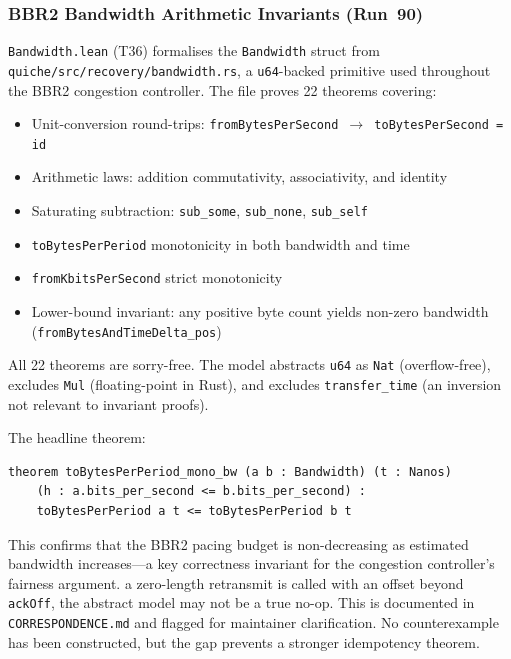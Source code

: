 \documentclass[sigconf,10pt]{acmart}
\begin{document}
\subsubsection{BBR2 Bandwidth Arithmetic Invariants (Run~90)}

\texttt{Bandwidth.lean} (T36) formalises the \texttt{Bandwidth} struct from
\texttt{quiche/src/recovery/bandwidth.rs}, a \texttt{u64}-backed primitive
used throughout the BBR2 congestion controller.
The file proves 22 theorems covering:

\begin{itemize}
  \item Unit-conversion round-trips:
    \texttt{fromBytesPerSecond~$\to$~toBytesPerSecond = id}
  \item Arithmetic laws: addition commutativity, associativity, and
    identity
  \item Saturating subtraction: \texttt{sub\_some}, \texttt{sub\_none},
    \texttt{sub\_self}
  \item \texttt{toBytesPerPeriod} monotonicity in both bandwidth and time
  \item \texttt{fromKbitsPerSecond} strict monotonicity
  \item Lower-bound invariant: any positive byte count yields non-zero
    bandwidth (\texttt{fromBytesAndTimeDelta\_pos})
\end{itemize}

All 22 theorems are sorry-free.
The model abstracts \texttt{u64} as \texttt{Nat} (overflow-free),
excludes \texttt{Mul} (floating-point in Rust), and excludes
\texttt{transfer\_time} (an inversion not relevant to invariant proofs).

The headline theorem:
\begin{lstlisting}[caption={\texttt{toBytesPerPeriod\_mono\_bw}: monotonicity of byte budget.}]
theorem toBytesPerPeriod_mono_bw (a b : Bandwidth) (t : Nanos)
    (h : a.bits_per_second <= b.bits_per_second) :
    toBytesPerPeriod a t <= toBytesPerPeriod b t
\end{lstlisting}

This confirms that the BBR2 pacing budget is non-decreasing as estimated
bandwidth increases---a key correctness invariant for the congestion
controller's fairness argument.
a zero-length retransmit is called with an offset beyond
\texttt{ackOff}, the abstract model may not be a true no-op.
This is documented in \texttt{CORRESPONDENCE.md} and flagged for
maintainer clarification.
No counterexample has been constructed, but the gap prevents a stronger
idempotency theorem.
\end{document}
